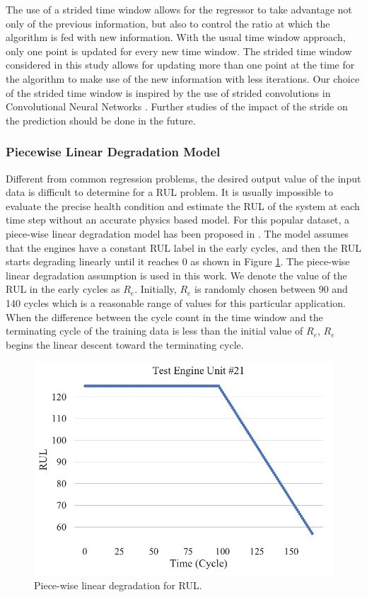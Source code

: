 \documentclass[preprint,12pt]{elsarticle}%
\begin{document}
The use of a strided time window allows for the regressor to take advantage not only of the previous information, but also to control the ratio at which the algorithm is fed with new information. With the usual time window approach, only one point is updated for every new time window. The strided time window considered in this study allows for updating more than one point at the time for the algorithm to make use of the new information with less iterations. Our choice of the strided time window is inspired by the use of strided convolutions in  Convolutional Neural Networks \cite{Kong2017}. Further studies of the impact of  the stride on the prediction should be done in the future.

\subsubsection{Piecewise Linear Degradation Model}

Different from common regression problems, the desired output value of the input data is difficult to determine for a RUL problem. It is usually impossible to evaluate the precise health condition and estimate the RUL of the system at each time step without an accurate physics based model. For this popular dataset, a piece-wise linear degradation model has been proposed in \cite{Ramasso2014}. The model assumes that the engines have a constant RUL label in the early cycles, and then the RUL starts degrading linearly until it reaches 0 as shown in Figure \ref{FigRULinear}. The piece-wise linear degradation assumption is used in this work. We denote the value of the RUL in the early cycles as $R_{e}$. Initially,  $R_{e}$ is randomly chosen between 90 and 140  cycles which is a reasonable range of values for this particular application. When the difference between the cycle count in the time window and the terminating cycle 
of the training data is less than the initial value of $R_{e}$, $R_{e}$ begins the linear descent toward the terminating cycle.

\begin{figure}[H]
\begin{center}
\includegraphics[scale=0.7]{Figures/test_engine.pdf}
\caption{Piece-wise linear degradation for RUL.}
\label{FigRULinear}
\end{center}
\end{figure}
\end{document}
